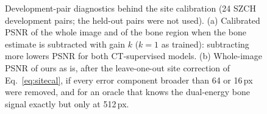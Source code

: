 \begin{figure}[htbp]
\centering
{}
\caption{Development-pair diagnostics behind the site calibration (24 SZCH development pairs; the held-out pairs were not used). (a)
Calibrated PSNR of the whole image and of the bone region when the bone estimate is subtracted with gain $k$ ($k=1$ as trained):
subtracting more lowers PSNR for both CT-supervised models. (b) Whole-image PSNR of ours as is, after the leave-one-out site correction of
Eq.~\eqref{eq:sitecal}, if every error component broader than 64 or 16\,px were removed, and for an oracle that knows the dual-energy bone
signal exactly but only at 512\,px.}
\label{fig:sitecal_diag}
\end{figure}

